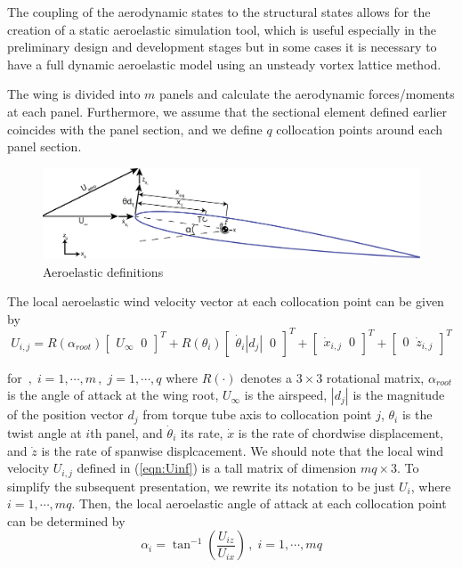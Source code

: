 \documentclass[11pt]{ucthesis}
\begin{document}
The coupling of the aerodynamic states to the structural states allows for the creation of a static aeroelastic simulation tool, which is useful especially in the preliminary design and development stages but in some cases it is necessary to have a full dynamic aeroelastic model using an unsteady vortex lattice method. 

The wing is divided into $m$ panels and calculate the aerodynamic forces/moments at each panel. Furthermore, we assume that the sectional element defined earlier coincides with the panel section, and we define $q$ collocation points around each panel section. 

\begin{figure}[h]
\centering
\includegraphics[width=1\linewidth]{Figures/FullAeroelasticDefinitions.png}
\caption{Aeroelastic definitions}
\label{fig:def}
\end{figure}

The local aeroelastic wind velocity vector at each collocation point can be given by
\begin{equation}
U_{i,j} = R(\alpha_{root})\begin{bmatrix}U_{\infty} \;\; 0\end{bmatrix}^T +  R(\theta_{i})\begin{bmatrix}\dot{\theta}_{i} |d_{j}| \;\; 0\end{bmatrix}^T + \begin{bmatrix}\dot{x}_{i,j}\;\; 0\end{bmatrix}^T + \begin{bmatrix}0\;\; \dot{z}_{i,j}\end{bmatrix}^T
\label{eqn:Uinf}
\end{equation}

for $ \,,\;i=1,\cdots, m\,,\;j=1,\cdots, q$ where $R(\cdot)$ denotes a $3\times 3$ rotational matrix, $\alpha_{root}$ is the angle of attack at the wing root, $U_{\infty}$ is the airspeed, $|d_{j}|$ is the magnitude of the position vector $d_{j}$ from torque tube axis to collocation point $j$, $\theta_i$ is the twist angle at $i$th panel, and $\dot{\theta}_i$ its rate, $\dot{x}$ is the rate of chordwise displacement, and $\dot{z}$ is the rate of spanwise displcacement. We should note that the local wind velocity $U_{i,j}$ defined in (\ref{eqn:Uinf}) is a tall matrix of dimension $mq \times 3$. To simplify the subsequent presentation, we rewrite its notation to be just $U_i$, where $i=1,\cdots,mq$. Then, the local aeroelastic angle of attack at each collocation point can be determined by
\begin{equation}
\alpha_{i} = \tan^{-1} \left (\frac{U_{iz}}{U_{ix}} \right) \,,\;i=1,\cdots, mq
\label{eqn:alpha_aero}
\end{equation}
\end{document}
